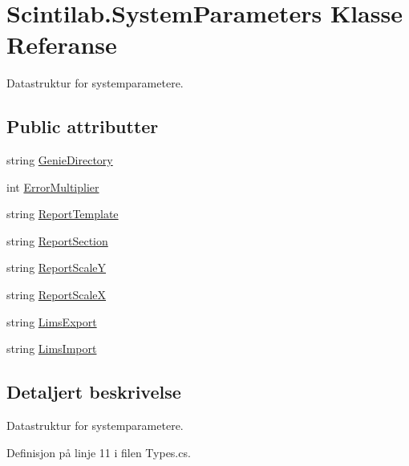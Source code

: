 \hypertarget{class_scintilab_1_1_system_parameters}{\section{Scintilab.\+System\+Parameters Klasse Referanse}
\label{class_scintilab_1_1_system_parameters}
}


Datastruktur for systemparametere.  


\subsection*{Public attributter}
\begin{DoxyCompactItemize}
\item 
string \hyperlink{class_scintilab_1_1_system_parameters_a0a5d782455fab30269e4cd8263f89e99}{Genie\+Directory}
\item 
int \hyperlink{class_scintilab_1_1_system_parameters_a48f4d463357d03dc6cfa679b79320152}{Error\+Multiplier}
\item 
string \hyperlink{class_scintilab_1_1_system_parameters_adc1b210a3c245e37f64147c8532cc041}{Report\+Template}
\item 
string \hyperlink{class_scintilab_1_1_system_parameters_afb477c19b940893124aeb9a0be9fc331}{Report\+Section}
\item 
string \hyperlink{class_scintilab_1_1_system_parameters_a8d41eba8006654a491889e44e86a0573}{Report\+Scale\+Y}
\item 
string \hyperlink{class_scintilab_1_1_system_parameters_aba5bbeddb5008d94218fefece754205d}{Report\+Scale\+X}
\item 
string \hyperlink{class_scintilab_1_1_system_parameters_a4a64c36d148176a1aafff5ee448e4bfd}{Lims\+Export}
\item 
string \hyperlink{class_scintilab_1_1_system_parameters_a3199c40e67608d3a8d0f7854b68649c5}{Lims\+Import}
\end{DoxyCompactItemize}


\subsection{Detaljert beskrivelse}
Datastruktur for systemparametere. 

Definisjon på linje 11 i filen Types.\+cs.



